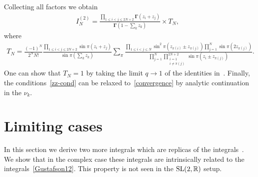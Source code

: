 \documentclass[pdftex]{sigma}
\numberwithin{equation}{section}
\begin{document}
Collecting all factors we obtain
\begin{gather*}
I_N^{(2)} = \frac{\prod\limits_{1\leq i<j\leq 2N+2}\boldsymbol\Gamma(z_i+z_j)}{\boldsymbol\Gamma\left( 1-\sum\limits_k z_k \right)} \times T_N ,
\end{gather*}
where
\begin{gather*}
T_N =\frac{(-1)^N}{2^{N} N!}\frac{\prod\limits_{1\leq i<j\leq 2N+2}\sin\pi(z_i+z_j)}{\sin\pi\left(\sum\limits_k z_k\right)}
 \sum_{\pi} \frac{\prod\limits_{1\leq i<j\leq N}
{\sin^2\pi(z_{\pi(i)}\pm z_{\pi(j)})} \prod\limits_{j=1}^N {\sin \pi (2 z_{\pi(j)})}}
{\prod\limits_{j=1}^N \prod\limits_{\substack{i=1\\ i\neq \pi(j)}}^{2N+2} {\sin\pi(z_i\pm z_{\pi(j)})}} .
\end{gather*}
One can show that $T_N=1$ by taking the limit $q\to 1$ of the identities in~\cite[equations~(7.11) and (7.12)]{Gustafson94}. Finally, the conditions~\eqref{zz-cond} can be relaxed to~\eqref{convergence} by analytic continuation in the $\nu_k$.

\section{Limiting cases}\label{sect:l-cases}

In this section we derive two more integrals which are replicas of the integrals~\cite[equations~(3.2) and (5.4)]{Gustafson92}. We show that in the complex case these integrals are intrinsically related to the integrals~\eqref{Gustafson12}. This property is not seen in the ${\rm SL}(2,\mathbb R)$ setup.
\end{document}
